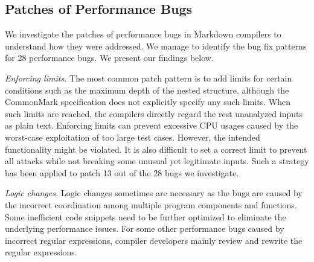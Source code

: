 \subsection{Patches of Performance Bugs}
\label{s:study-patch}
We investigate the patches of performance bugs in Markdown compilers to understand how they were addressed.
%
We manage to identify the bug fix patterns for 28 performance bugs.
%
We present our findings below.
%

 \emph{Enforcing limits.}
%
The most common patch pattern is to add limits for certain conditions such as the maximum depth of the nested structure,
%
although the CommonMark specification does not explicitly specify any such limits.
%
%
When such limits are reached, the compilers directly regard the rest unanalyzed inputs as plain text.
%
%
%
Enforcing limits can prevent excessive CPU usages caused by the worst-case exploitation of too large test cases.
%
However, 
the intended functionality might be violated.
%
It is also difficult to set a correct limit to prevent all attacks while not breaking some unusual yet legitimate inputs.
%
%
Such a strategy has been applied to patch 13 out of the 28 bugs we investigate.

 \emph{Logic changes.}
Logic changes sometimes are necessary as the bugs are caused by the incorrect coordination among multiple program components and functions.
%
Some inefficient code snippets need to be further optimized to eliminate the underlying performance issues.
%
For some other performance bugs caused by incorrect regular expressions,
compiler developers mainly review and rewrite the regular expressions.
\fi
